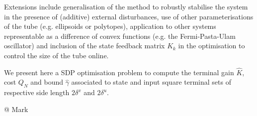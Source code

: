 \documentclass[letterpaper, 10 pt, conference]{ieeeconf}
\begin{document}
Extensions include generalisation of the method to robustly stabilise the system in the presence of (additive) external disturbances, use of other parameterisations of the tube (e.g. ellipsoids or polytopes), application to other systems representable as a difference of convex functions (e.g. the Fermi-Pasta-Ulam oscillator) and inclusion of the state feedback matrix $K_k$  in the optimisation to control the size of the tube online.  


 


\appendix
We present here a SDP optimisation problem to compute the terminal gain $\hat{K}$, cost $Q_N$ and bound $\hat{\gamma}$ associated to state and input square terminal sets of respective side length $2\delta^x$ and  $2\delta^u$. 

@ Mark 
\end{document}
